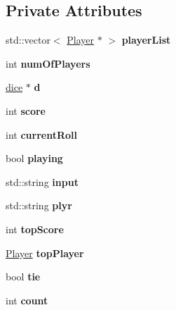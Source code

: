 \subsection*{Private Attributes}
\begin{DoxyCompactItemize}
\item 
\mbox{\label{classpig_a548163e47b2f1b82fd9fb6c20caf7092}} 
std\+::vector$<$ \hyperlink{classPlayer}{Player} $\ast$ $>$ {\bfseries player\+List}
\item 
\mbox{\label{classpig_ae4fe8f68279a723773d0041f4210c315}} 
int {\bfseries num\+Of\+Players}
\item 
\mbox{\label{classpig_ad7c324c675cf9b720c3144be43093d83}} 
\hyperlink{classdice}{dice} $\ast$ {\bfseries d}
\item 
\mbox{\label{classpig_a7ef22bd927c220866f15abcb28f33f32}} 
int {\bfseries score}
\item 
\mbox{\label{classpig_aa79cb61f2628fe37edd36ad76af4d081}} 
int {\bfseries current\+Roll}
\item 
\mbox{\label{classpig_abfb581424e14beb6250acf5df111a417}} 
bool {\bfseries playing}
\item 
\mbox{\label{classpig_a6a6c1566b19486cceb33910c902348b0}} 
std\+::string {\bfseries input}
\item 
\mbox{\label{classpig_ac35d859274db9267f8b7039b50e65bfe}} 
std\+::string {\bfseries plyr}
\item 
\mbox{\label{classpig_a5159b3cb3879e33b9bf1adad4c2c270b}} 
int {\bfseries top\+Score}
\item 
\mbox{\label{classpig_a98a7c1492538a8c643a42eba071ca7e4}} 
\hyperlink{classPlayer}{Player} {\bfseries top\+Player}
\item 
\mbox{\label{classpig_a1d5787bef5d4a72458e84c4b094b00fe}} 
bool {\bfseries tie}
\item 
\mbox{\label{classpig_a99faed0cf1d6a816db10e100531f698f}} 
int {\bfseries count}
\end{DoxyCompactItemize}


